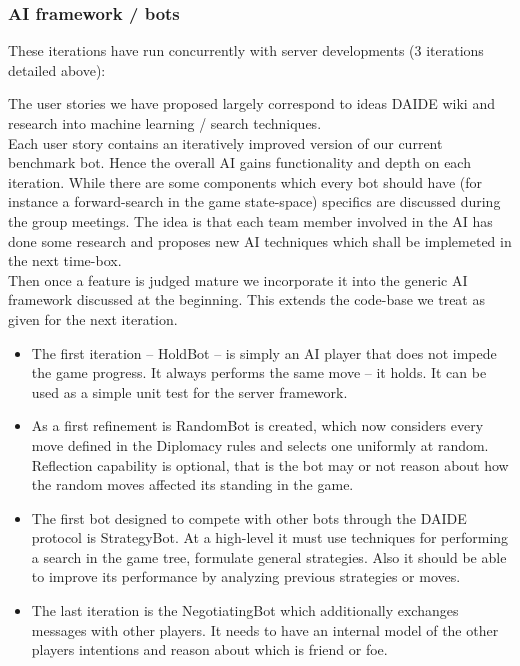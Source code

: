 \documentclass[11pt]{article} \usepackage{fullpage} \usepackage{cite}
\begin{document}
\subsubsection{AI framework / bots}

These iterations have run concurrently with server developments (3 iterations
detailed above):

The user stories we have proposed largely correspond to ideas DAIDE wiki and
research into machine learning / search techniques.  \\ Each user story contains
an iteratively improved version of our current benchmark bot. Hence the overall
AI gains functionality and depth on each iteration. While there are some
components which every bot should have (for instance a forward-search in the
game state-space) specifics are discussed during the group meetings. The idea is
that each team member involved in the AI has done some research and proposes new
AI techniques which shall be implemeted in the next time-box.  \\ Then once a
feature is judged mature we incorporate it into the generic AI framework
discussed at the beginning. This extends the code-base we treat as given for the
next iteration.

\begin{itemize}
\item The first iteration -- HoldBot -- is simply an AI player that does not
  impede the game progress. It always performs the same move -- it holds.  It
  can be used as a simple unit test for the server framework.
\item As a first refinement is RandomBot is created, which now considers every
  move defined in the Diplomacy rules and selects one uniformly at random.
  Reflection capability is optional, that is the bot may or not reason about how
  the random moves affected its standing in the game.
\item The first bot designed to compete with other bots through the DAIDE
  protocol is StrategyBot. At a high-level it must use techniques for performing
  a search in the game tree, formulate general strategies. Also it should be
  able to improve its performance by analyzing previous strategies or moves.
\item The last iteration is the NegotiatingBot which additionally exchanges
  messages with other players. It needs to have an internal model of the other
  players intentions and reason about which is friend or foe.
\end{itemize}
\end{document}
